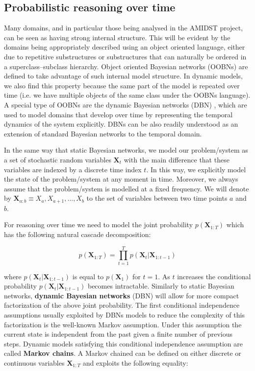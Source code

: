 \subsection{Probabilistic reasoning over time}\label{SubSection:DBNs}

Many domains, and in particular those being analysed in the AMIDST project, can be seen as having strong internal structure. This will be evident by the domains being appropriately described using an object oriented language, either due to repetitive substructures or substructures that can naturally be ordered in a superclass–subclass hierarchy.  Object oriented Bayesian networks \cite{KollerPfeffer1997} (OOBNs) are defined to take advantage of such internal model structure. In dynamic models, we also find this property because the same part of the model is repeated over time (i.e. we have multiple objects of the same class under the OOBNs language). A special type of OOBNs are the dynamic Bayesian networks (DBN) \cite{DeanKanazawa1989}, which are used to model domains that develop over time by representing the temporal dynamics of the system explicitly. DBNs can be also readily understood as an extension of standard Bayesian networks to the temporal domain. 

In the same way that static Bayesian networks, we model our problem/system as a set of stochastic random variables $\bm X_t$ with the main difference that these variables are indexed by a discrete time index $t$. In this way,  we explicitly model the state of the problem/system at any moment in time. Moreover,  we always assume that the problem/system is modelled at a fixed frequency. We will denote by $\bm X_{a:b} \equiv X_a,X_{a+1},\ldots,X_{b}$ to the set of variables between two time points $a$ and $b$.  

For reasoning over time we need to model the joint probability $p(\bm X_{1:T})$ which has the following natural cascade decomposition:

$$p(\bm X_{1:T})  = \prod_{t=1}^T p(\bm X_t|\bm X_{1:t-1})$$

\noindent where $p(\bm X_t|\bm X_{1:t-1})$ is equal to $p(\bm X_1)$ for $t=1$. As $t$ increases the conditional probability $p(\bm X_t|\bm X_{1:t-1})$ becomes intractable. Similarly to static Bayesian networks, \textbf{dynamic Bayesian networks} (DBN) will allow for more compact factorization of the above joint probability. The first conditional independence assumptions usually  exploited by DBNs models to reduce the complexity of this factorization is the well-known Markov assumption. Under this assumption the current state is independent from the past given a finite number of previous steps.  Dynamic models satisfying this conditional independence assumption are called \textbf{Markov chains}. A Markov chained can be defined on either discrete or continuous variables $\bm X_{1:T}$ and exploits the following equality:

